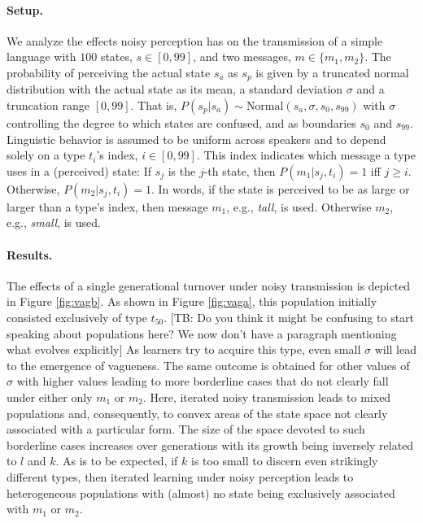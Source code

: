 \documentclass[10pt,a4paper]{article}
\newcommand{\tb}[1]{\textcolor[rgb]{.8,.33,.0}{[TB: #1]}}%
\begin{document}
\paragraph{Setup.}  We analyze the effects noisy perception has on the transmission of a simple language with $100$
states, $s \in [0,99]$, and two messages, $m \in \{m_1,m_2\}$. The probability of perceiving the
actual state $s_a$ as $s_p$ is given by a truncated normal distribution with the actual state as its mean, 
a standard deviation $\sigma$ and a truncation range $[0,99]$. That is, $P(s_p | s_a) \sim \text{Normal}(s_{a},\sigma,s_{0},s_{99})$
with $\sigma$ controlling the degree to which states are confused, and as boundaries $s_{0}$ and $s_{99}$. Linguistic behavior is assumed to be uniform across speakers and to depend solely on a type $t_i$'s index, $i \in [0,99]$. This index indicates which message a type uses in a (perceived) state: If $s_j$ is the $j$-th state, then $P(m_1|s_j,t_i) = 1$ iff $j \geq i$. Otherwise, $P(m_2|s_j,t_i) = 1$. In words, if the state is perceived to be as large or larger than a type's index, then message $m_1$, e.g., {\em tall}, is used. Otherwise $m_2$, e.g., {\em small}, is used.

\paragraph{Results.} The effects of a single generational turnover under noisy transmission is depicted in Figure \ref{fig:vagb}. As shown in Figure \ref{fig:vaga}, this population initially consisted exclusively of type $t_{50}$. \tb{Do you think it might be confusing to start speaking about populations here? We now don't have a paragraph mentioning what evolves explicitly} As learners try to acquire this type, even small $\sigma$ will lead to the emergence of vagueness. The same outcome is obtained for other values of $\sigma$ with higher values leading to more borderline cases that do not clearly fall under either only $m_1$ or $m_2$. Here, iterated noisy transmission leads to mixed populations and, consequently, to convex areas of the state space not clearly associated with a particular form. The size of the space devoted to such borderline cases increases over generations with its growth being inversely related to $l$ and $k$. As is to be expected, if $k$ is too small to discern even strikingly different types, then iterated learning under noisy perception leads to heterogeneous populations with (almost) no state being exclusively associated with $m_1$ or $m_2$.
\end{document}
